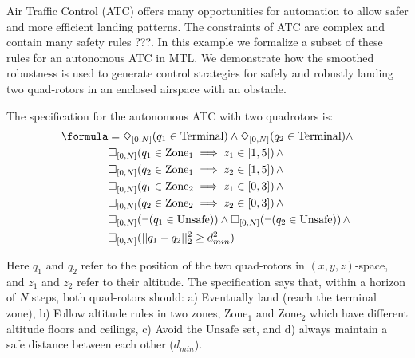 
Air Traffic Control (ATC) offers many opportunities for automation to allow safer and more efficient landing patterns. 
The constraints of ATC are complex and contain many safety rules \cite{}???. 
In this example we formalize a subset of these rules for an autonomous ATC in MTL.
We demonstrate how the smoothed robustness is used to generate control strategies for safely and robustly landing two quad-rotors in an enclosed airspace with an obstacle. 

The specification for the autonomous ATC with two quadrotors is:
{\small
\begin{subequations}
\begin{align}
\formula &= \eventually_{[0,N]}(q_1 \in \text{Terminal}) \land \eventually_{[0,N]}(q_2 \in \text{Terminal}) \land   \nonumber \\
& \always_{[0,N]} (q_1 \in \text{Zone}_1 \implies z_1 \in [1,5]) \, \land \nonumber \\
& \always_{[0,N]} (q_2 \in \text{Zone}_1 \implies z_2 \in [1,5]) \, \land \nonumber \\
& \always_{[0,N]} (q_1 \in \text{Zone}_2 \implies z_1 \in [0,3]) \, \land \nonumber \\
& \always_{[0,N]} (q_2 \in \text{Zone}_2 \implies z_2 \in [0,3]) \, \land \nonumber \\
& \always_{[0,N]} (\neg (q_1 \in \text{Unsafe})) \land \always_{[0,N]} (\neg (q_2 \in \text{Unsafe})) \, \land  \nonumber \\
& \always_{[0,N]} (||q_1-q_2||_2^2 \geq d_{min}^2)
\end{align}
\end{subequations}
}

Here $q_1$ and $q_2$ refer to the position of the two quad-rotors in $(x,y,z)$-space, and $z_1$ and $z_2$ refer to their altitude. The specification says that, within a horizon of $N$ steps,  both quad-rotors 
should: 
a) Eventually land (reach the terminal zone), 
b) Follow altitude rules in two zones, $\text{Zone}_1$ and $\text{Zone}_2$ which have different altitude floors and ceilings,
c) Avoid the $\text{Unsafe}$ set, and d) always maintain a safe distance between each other ($d_{min}$). 


